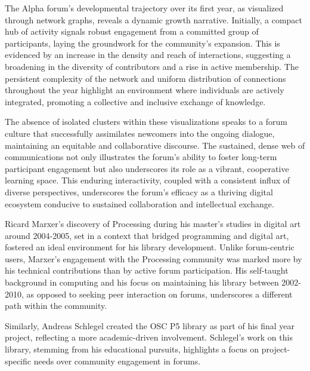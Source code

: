 \hfill
\begin{minipage}[t]{0.25\textwidth}
  \vspace{8mm}
  \small
  The Alpha forum's developmental trajectory over its first year, as visualized through network graphs, reveals a dynamic growth narrative. Initially, a compact hub of activity signals robust engagement from a committed group of participants, laying the groundwork for the community's expansion. This is evidenced by an increase in the density and reach of interactions, suggesting a broadening in the diversity of contributors and a rise in active membership. The persistent complexity of the network and uniform distribution of connections throughout the year highlight an environment where individuals are actively integrated, promoting a collective and inclusive exchange of knowledge.

  \medskip
  The absence of isolated clusters within these visualizations speaks to a forum culture that successfully assimilates newcomers into the ongoing dialogue, maintaining an equitable and collaborative discourse. The sustained, dense web of communications not only illustrates the forum's ability to foster long-term participant engagement but also underscores its role as a vibrant, cooperative learning space. This enduring interactivity, coupled with a consistent influx of diverse perspectives, underscores the forum's efficacy as a thriving digital ecosystem conducive to sustained collaboration and intellectual exchange.

\end{minipage}


Ricard Marxer's discovery of Processing during his master's studies in digital art around 2004-2005, set in a context that bridged programming and digital art, fostered an ideal environment for his library development. Unlike forum-centric users, Marxer's engagement with the Processing community was marked more by his technical contributions than by active forum participation. His self-taught background in computing and his focus on maintaining his library between 2002-2010, as opposed to seeking peer interaction on forums, underscores a different path within the community​​​​.

Similarly, Andreas Schlegel created the OSC P5 library as part of his final year project, reflecting a more academic-driven involvement. Schlegel's work on this library, stemming from his educational pursuits, highlights a focus on project-specific needs over community engagement in forums​​.

